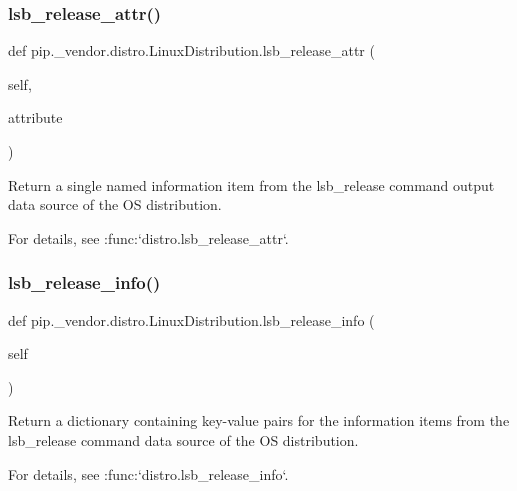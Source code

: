 \subsubsection{\texorpdfstring{lsb\+\_\+release\+\_\+attr()}{lsb\_release\_attr()}}
{\footnotesize\ttfamily def pip.\+\_\+vendor.\+distro.\+Linux\+Distribution.\+lsb\+\_\+release\+\_\+attr (\begin{DoxyParamCaption}\item[{}]{self,  }\item[{}]{attribute }\end{DoxyParamCaption})}

\begin{DoxyVerb}Return a single named information item from the lsb_release command
output data source of the OS distribution.

For details, see :func:`distro.lsb_release_attr`.
\end{DoxyVerb}
 \mbox{\label{classpip_1_1__vendor_1_1distro_1_1LinuxDistribution_afe0f672a343886952d8810433847a07f}} 
\subsubsection{\texorpdfstring{lsb\+\_\+release\+\_\+info()}{lsb\_release\_info()}}
{\footnotesize\ttfamily def pip.\+\_\+vendor.\+distro.\+Linux\+Distribution.\+lsb\+\_\+release\+\_\+info (\begin{DoxyParamCaption}\item[{}]{self }\end{DoxyParamCaption})}

\begin{DoxyVerb}Return a dictionary containing key-value pairs for the information
items from the lsb_release command data source of the OS
distribution.

For details, see :func:`distro.lsb_release_info`.
\end{DoxyVerb}
 \mbox{\label{classpip_1_1__vendor_1_1distro_1_1LinuxDistribution_a506c0bccc9c7486786b399ef3d0ac122}} 
